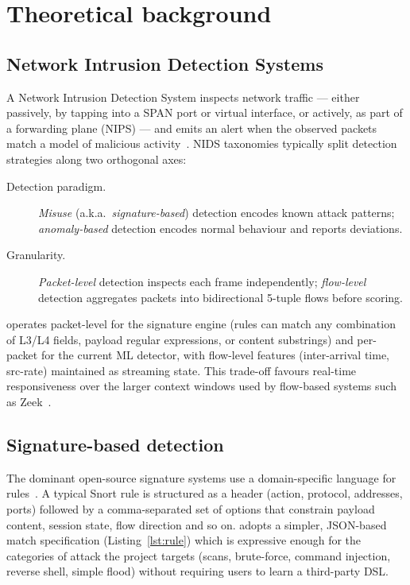 \section{Theoretical background}
\label{sec:background}

\subsection{Network Intrusion Detection Systems}

A Network Intrusion Detection System inspects network traffic --- either
passively, by tapping into a SPAN port or virtual interface, or actively,
as part of a forwarding plane (NIPS) --- and emits an alert when the
observed packets match a model of malicious activity~\cite{garcia2009anomaly,
buczak2016survey}. NIDS taxonomies typically split detection strategies
along two orthogonal axes:
\begin{description}
    \item[Detection paradigm.] \textit{Misuse} (a.k.a.\
        \textit{signature-based}) detection encodes known attack
        patterns; \textit{anomaly-based} detection encodes normal
        behaviour and reports deviations.
    \item[Granularity.] \textit{Packet-level} detection inspects each
        frame independently; \textit{flow-level} detection aggregates
        packets into bidirectional 5-tuple flows before scoring.
\end{description}

\nidsname{} operates packet-level for the signature engine (rules can
match any combination of L3/L4 fields, payload regular expressions, or
content substrings) and per-packet for the current ML detector, with
flow-level features (inter-arrival time, src-rate) maintained as
streaming state. This trade-off favours real-time responsiveness over
the larger context windows used by flow-based systems such as
Zeek~\cite{paxson1999bro}.

\subsection{Signature-based detection}

The dominant open-source signature systems use a domain-specific
language for rules~\cite{roesch1999snort,suricata}. A typical Snort rule
is structured as a header (action, protocol, addresses, ports) followed
by a comma-separated set of options that constrain payload content,
session state, flow direction and so on. \nidsname{} adopts a simpler,
JSON-based match specification (Listing~\ref{lst:rule}) which is
expressive enough for the categories of attack the project targets
(scans, brute-force, command injection, reverse shell, simple flood)
without requiring users to learn a third-party DSL.

